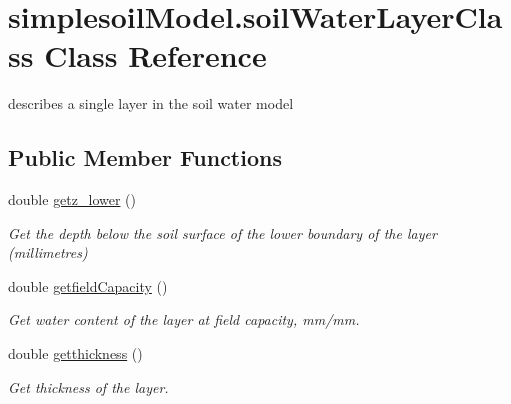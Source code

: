 \hypertarget{classsimplesoil_model_1_1soil_water_layer_class}{}\section{simplesoil\+Model.\+soil\+Water\+Layer\+Class Class Reference}
\label{classsimplesoil_model_1_1soil_water_layer_class}


describes a single layer in the soil water model  


\subsection*{Public Member Functions}
\begin{DoxyCompactItemize}
\item 
\mbox{\label{classsimplesoil_model_1_1soil_water_layer_class_a19bf8dada96698408785d7107cd3e727}} 
double \mbox{\hyperlink{classsimplesoil_model_1_1soil_water_layer_class_a19bf8dada96698408785d7107cd3e727}{getz\+\_\+lower}} ()
\begin{DoxyCompactList}\small\item\em Get the depth below the soil surface of the lower boundary of the layer (millimetres) \end{DoxyCompactList}\item 
\mbox{\label{classsimplesoil_model_1_1soil_water_layer_class_a6edc46e4aa1dd094ddb1af43bcae66c7}} 
double \mbox{\hyperlink{classsimplesoil_model_1_1soil_water_layer_class_a6edc46e4aa1dd094ddb1af43bcae66c7}{getfield\+Capacity}} ()
\begin{DoxyCompactList}\small\item\em Get water content of the layer at field capacity, mm/mm. \end{DoxyCompactList}\item 
\mbox{\label{classsimplesoil_model_1_1soil_water_layer_class_a98ded129a2dd2c7acabdecced57b9c6e}} 
double \mbox{\hyperlink{classsimplesoil_model_1_1soil_water_layer_class_a98ded129a2dd2c7acabdecced57b9c6e}{getthickness}} ()
\begin{DoxyCompactList}\small\item\em Get thickness of the layer. \end{DoxyCompactList}\item 

\end{DoxyCompactItemize}
